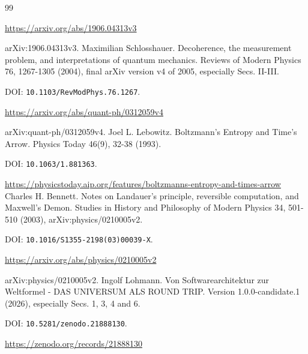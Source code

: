 \begin{thebibliography}{99}
\par\url{https://arxiv.org/abs/1906.04313v3}
\par arXiv:1906.04313v3.
Maximilian Schlosshauer. Decoherence, the measurement problem, and interpretations of quantum mechanics. Reviews of Modern Physics 76, 1267-1305 (2004), final arXiv version v4 of 2005, especially Secs. II-III.
\par DOI: \nolinkurl{10.1103/RevModPhys.76.1267}.
\par\url{https://arxiv.org/abs/quant-ph/0312059v4}
\par arXiv:quant-ph/0312059v4.
Joel L. Lebowitz. Boltzmann's Entropy and Time's Arrow. Physics Today 46(9), 32-38 (1993).
\par DOI: \nolinkurl{10.1063/1.881363}.
\par\url{https://physicstoday.aip.org/features/boltzmanns-entropy-and-times-arrow}
Charles H. Bennett. Notes on Landauer's principle, reversible computation, and Maxwell's Demon. Studies in History and Philosophy of Modern Physics 34, 501-510 (2003), arXiv:physics/0210005v2.
\par DOI: \nolinkurl{10.1016/S1355-2198(03)00039-X}.
\par\url{https://arxiv.org/abs/physics/0210005v2}
\par arXiv:physics/0210005v2.
Ingolf Lohmann. Von Softwarearchitektur zur Weltformel - DAS UNIVERSUM ALS ROUND TRIP. Version 1.0.0-candidate.1 (2026), especially Secs. 1, 3, 4 and 6.
\par DOI: \nolinkurl{10.5281/zenodo.21888130}.
\par\url{https://zenodo.org/records/21888130}
\end{thebibliography}
